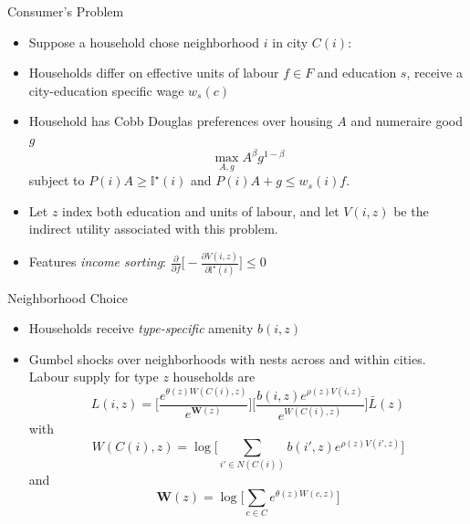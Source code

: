\documentclass{beamer}
\begin{document}
\begin{frame}{Consumer's Problem}
	\begin{itemize}
		\color{black}
		\itemsep1em
		\item Suppose a household chose neighborhood $i$ in city $C(i)$: \pause
		\item Households differ on effective units of labour $f \in F$ and education $s$, receive a city-education specific wage $w_{s}(c)$ \pause
		\item Household has Cobb Douglas preferences over housing $A$ and numeraire good $g$
		\begin{equation}\label{utility}
			\max_{A, g} A^{\beta}g^{1-\beta}
		\end{equation} 
		subject to \color{red}$P(i)A \geq \mathbb{I}^{\star}(i)$ \color{black} and $P(i)A + g \leq w_{s}(i)f$. \pause
		
		\item Let $z$ index both education and units of labour, and let $V(i, z)$ be the indirect utility associated with this problem. \pause 
		
		\item Features \textit{income sorting}: $\frac{\partial}{\partial f}\bigg[-\frac{\partial V(i, z)}{\partial \mathbb{I}^{\star}(i)}\bigg] \leq 0 $ 
	\end{itemize}
	
\end{frame}

\begin{frame}{Neighborhood Choice}
	\begin{itemize}
		\color{black}
		\item Households receive \textit{type-specific} amenity $b(i, z)$ \pause
		\item Gumbel shocks over neighborhoods with nests across and within cities. Labour supply for type $z$ households are 
		\begin{equation}\label{laboursupply}
	L(i, z) = \bigg[\frac{e^{\theta(z) W(C(i), z)}}{e^{\boldsymbol{W}(z)}}\bigg]\bigg[\frac{b(i, z)e^{\rho(z) V(i, z)}}{e^{W(C(i), z)}}\bigg]\bar{L}(z)
		\end{equation}
		\pause with 
		\begin{equation*}
 	W(C(i), z) = \log\bigg[\sum_{i' \in N(C(i))}b(i', z)e^{\rho(z) V(i', z)}\bigg]
		\end{equation*} 
		\pause and
		\begin{equation*}
\boldsymbol{W}(z) = \log\bigg[\sum_{c \in C} e^{\theta(z) W(c, z)}\bigg]
		\end{equation*}
	\end{itemize}
\end{frame}
\end{document}
